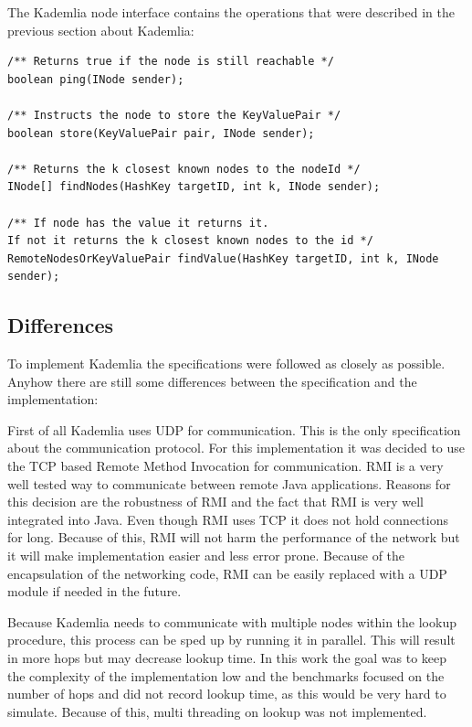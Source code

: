 \documentclass[a4paper, 12pt]{article} %
\begin{document}
The Kademlia node interface contains the operations that were described in the previous section about Kademlia:  

\begin{verbatim}
/** Returns true if the node is still reachable */
boolean ping(INode sender);

/** Instructs the node to store the KeyValuePair */
boolean store(KeyValuePair pair, INode sender);

/** Returns the k closest known nodes to the nodeId */
INode[] findNodes(HashKey targetID, int k, INode sender);

/** If node has the value it returns it. 
If not it returns the k closest known nodes to the id */
RemoteNodesOrKeyValuePair findValue(HashKey targetID, int k, INode sender);
\end{verbatim}


\subsection{Differences}

To implement Kademlia the specifications were followed as closely as possible. Anyhow there are still some differences between the specification and the implementation:

First of all Kademlia uses UDP for communication. This is the only specification about the communication protocol. For this implementation it was decided to use the TCP based Remote Method Invocation for communication. RMI is a very well tested way to communicate between remote Java applications. Reasons for this decision are the robustness of RMI and the fact that RMI is very well integrated into Java. Even though RMI uses TCP it does not hold connections for long. Because of this, RMI will not harm the performance of the network but it will make implementation easier and less error prone. Because of the encapsulation of the networking code, RMI can be easily replaced with a UDP module if needed in the future.

Because Kademlia needs to communicate with multiple nodes within the lookup procedure, this process can be sped up by running it in parallel. This will result in more hops but may decrease lookup time. In this work the goal was to keep the complexity of the implementation low and the benchmarks focused on the number of hops and did not record lookup time, as this would be very hard to simulate. Because of this, multi threading on lookup was not implemented. 
\end{document}
